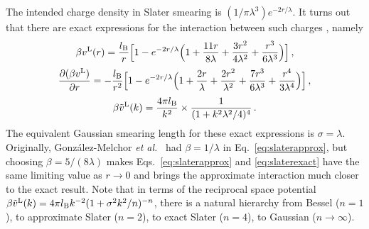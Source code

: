 \documentclass[12pt,a4paper]{article}
\newcommand{\latin}[1]{\emph{#1}}
\newcommand{\etal}{\latin{et al.}}
\newcommand{\lr}{^{\mathrm{L}}}
\newcommand{\Eqref}[1]{Eq.~\eqref{#1}}
\newcommand{\Eqsref}[1]{Eqs.~\eqref{#1}}
\begin{document}
The intended charge density in Slater smearing is
$(1/\pi\lambda^3)e^{-2r/\lambda}$.  It turns out that there are exact
expressions for the interaction between such charges \cite{WV14},
namely
%
\begin{equation}
  \beta v\lr(r)=\frac{\lB}{r}\Bigl[1-e^{-2r/\lambda}\Bigl(
    1+\frac{11r}{8\lambda}+\frac{3r^2}{4\lambda^2}
    +\frac{r^3}{6\lambda^3}\Bigr)\Bigr]\,,\label{eq:slaterexact}
\end{equation}
%
\begin{equation}
  \frac{\partial(\beta v\lr)}{\partial r}=
  -\frac{\lB}{r^2}\Bigl[1-e^{-2r/\lambda}\Bigl(
    1+\frac{2r}{\lambda}+\frac{2r^2}{\lambda^2}
    +\frac{7r^3}{6\lambda^3}+\frac{r^4}{3\lambda^4}\Bigr)\Bigr]\,,
\end{equation}
%
\begin{equation}
\beta {\tilde v}\lr(k)=\frac{4\pi\lB}{k^2}\times\frac{1}{(1+k^2\lambda^2/4)^4}\,.
\end{equation}
%
The equivalent Gaussian smearing length for these exact expressions is
$\sigma=\lambda$.  Originally, Gon\-z\'a\-lez-Melchor
\etal\ \cite{GM+06} had $\beta=1/\lambda$ in \Eqref{eq:slaterapprox},
but choosing $\beta=5/(8\lambda)$ makes \Eqsref{eq:slaterapprox} and
\eqref{eq:slaterexact} have the same limiting value as $r\to0$ and
brings the approximate interaction much closer to the exact result.
Note that in terms of the reciprocal space potential $\beta {\tilde
  v}\lr(k)=4\pi\lB k^{-2}(1+\sigma^2k^2/n)^{-n}$, there is a natural
hierarchy from Bessel ($n=1$), to approximate Slater ($n=2$), to
exact Slater ($n=4$), to Gaussian ($n\to\infty$).
\end{document}
